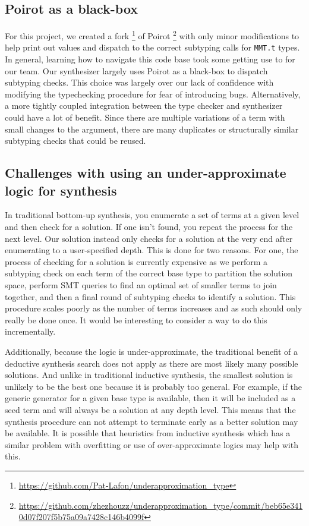 \documentclass[review, sigplan]{acmart}
\begin{document}
\subsection{Poirot as a black-box}
For this project, we created a fork
\footnote{\url{https://github.com/Pat-Lafon/underapproximation_type}} of Poirot
\footnote{\url{https://github.com/zhezhouzz/underapproximation_type/commit/beb65e3410d07f207f5b75a09a7428c146b4099f}}
with only minor modifications to help print out values and dispatch to the
correct subtyping calls for \lstinline|MMT.t| types. In general, learning how to
navigate this code base took some getting use to for our team. Our synthesizer
largely uses Poirot as a black-box to dispatch subtyping checks. This choice was
largely over our lack of confidence with modifying the typechecking procedure
for fear of introducing bugs. Alternatively, a more tightly coupled integration
between the type checker and synthesizer could have a lot of benefit. Since
there are multiple variations of a term with small changes to the argument,
there are many duplicates or structurally similar subtyping checks that could
be reused.

\subsection{Challenges with using an under-approximate logic for synthesis}
In traditional bottom-up synthesis, you enumerate a set of terms at a given
level and then check for a solution. If one isn't found, you repeat the process
for the next level. Our solution instead only checks for a solution at the very
end after enumerating to a user-specified depth. This is done for two reasons.
For one, the process of checking for a solution is currently expensive as we
perform a subtyping check on each term of the correct base type to partition the
solution space, perform SMT queries to find an optimal set of smaller terms to
join together, and then a final round of subtyping checks to identify a
solution. This procedure scales poorly as the number of terms increases and as
such should only really be done once. It would be interesting to consider a way
to do this incrementally.

Additionally, because the logic is under-approximate, the traditional benefit of
a deductive synthesis search does not apply as there are most likely many
possible solutions. And unlike in traditional inductive synthesis, the smallest
solution is unlikely to be the best one because it is probably too general. For
example, if the generic generator for a given base type is available, then it
will be included as a seed term and will always be a solution at any depth
level. This means that the synthesis procedure can not attempt to terminate
early as a better solution may be available. It is possible that heuristics from
inductive synthesis which has a similar problem with overfitting or use of
over-approximate logics may help with this.
\end{document}
